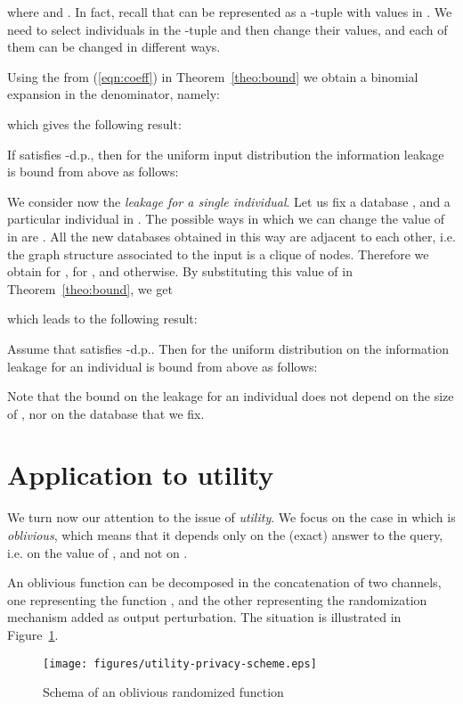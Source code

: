 \documentclass{llncs}
\begin{document}
where  and . In fact, recall that  
can be represented as a -tuple with values in . 
We need to select  individuals in the -tuple and then change their values, and each of them can be changed  in  different ways.  

Using the  from (\ref{eqn:coeff}) in Theorem~\ref{theo:bound} we obtain a binomial expansion in the denominator, namely:

which gives the following result: 

\begin{theorem}
If  satisfies -d.p., then for the uniform input distribution the information leakage is bound from above as follows: 

\end{theorem}


We consider now the \emph{leakage for a single individual}. Let us fix a database , and a particular individual  in . The  possible ways in which we can change the value of  in 
 are . All the new databases obtained in this way are adjacent to each other, i.e. the graph structure associated to the input is a clique of  nodes. 
Therefore we obtain  for ,  for , and  otherwise. 
By substituting this value of  in Theorem~\ref{theo:bound}, we get

which leads to the following result:
\begin{proposition}\label{prop:ind}
Assume that  satisfies -d.p.. Then for the uniform distribution on  the information leakage for an individual is bound from above as  follows: 

\end{proposition}
Note  that the bound on the leakage for an individual does not depend on the size of , nor on the database  that we fix.
		
\section{Application to utility}
\label{sec:utility}
We turn now our attention to the issue of \emph{utility}. We focus on the case in which  is \emph{oblivious}, which means that it depends only on the (exact) answer to the query, i.e. on the value of , and not on .  
 
An oblivious  function can be decomposed in the concatenation of two channels, one representing the function , and the other representing the randomization mechanism  
added  as output perturbation. The situation is illustrated in Figure~\ref{fig:ut-leak-scheme}. 

\begin{figure}[t]\centering
		\texttt{[image: figures/utility-privacy-scheme.eps]}\caption{Schema of an oblivious randomized function}\label{fig:ut-leak-scheme}\end{figure}
\end{document}
